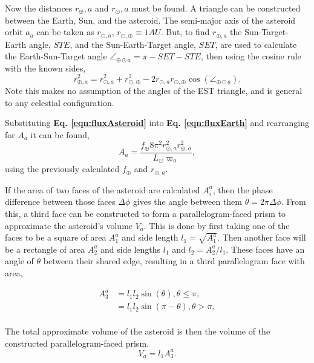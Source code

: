 \documentclass[10pt,twocolumn]{revtex4}    %
\newcommand*{\astrosun}{{\odot}}
\newcommand*{\earth}{{\oplus}}
\newcommand{\EST}{\angle_{\earth\astrosun a}}
\begin{document}
Now the distances $r_\earth,a$ and $r_\astrosun,a$ must be found. A triangle can be constructed between the Earth, Sun, and the asteroid. The semi-major axis of the asteroid orbit $a_a$ can be taken as $r_{\astrosun,a}$, $r_{\astrosun,\earth} \equiv 1AU$. But, to find $r_{\earth, a}$ the Sun-Target-Earth angle, $STE$, and the Sun-Earth-Target angle, $SET$, are used to calculate the Earth-Sun-Target angle $\EST = \pi - SET - STE$, then using the cosine rule with the known sides,
\begin{equation} \label{eqn:cosRule}
    r_{\earth,a}^2 = r_{\astrosun, a}^2 + r_{\astrosun, \earth}^2 - 2 r_{\astrosun,a} r_{\astrosun,\earth}\cos{(\angle_{\earth\astrosun a})}.
\end{equation}Note this makes no assumption of the angles of the EST triangle, and is general to any celestial configuration.  


Substituting \textbf{Eq. \ref{eqn:fluxAsteroid}} into \textbf{Eq. \ref{eqn:fluxEarth}} and rearranging for $A_{a}$ it can be found,
\begin{equation}\label{eqn:areaAsteroid}
    A_{a} = \frac{f_\earth 8 \pi^2 r^2_{\astrosun,a} r^2_{\earth, a}}{L_\astrosun \varpi_{a}},
\end{equation}
using the previously calculated  $f_\earth$ and $r_{\earth,a}$.

If the area of two faces of the asteroid are calculated $A^a_i$, then the phase difference between those faces $\Delta \phi$ gives the angle between them $\theta = 2\pi \Delta \phi$. From this, a third face can be constructed to form a parallelogram-faced prism to approximate the asteroid's volume $V_a$.
This is done by first taking one of the faces to be a square of area $A^a_1$ and side length $l_1 = \sqrt{A^a_1}$. Then another face will be a rectangle of area $A^a_2$ and side lengths $l_1$ and $l_2 = A^a_2/l_1$. These faces have an angle of $\theta$ between their shared edge, resulting in a third parallelogram face with area,

\begin{equation}\label{eqn:Aa3}
    \begin{split}
    A^a_3  &= l_1 l_2 \sin{(\theta)}, \theta \leq \pi, \\
            &= l_1 l_2 \sin{(\pi - \theta)}, \theta > \pi, \\
    \end{split}
\end{equation}

The total approximate volume of the asteroid is then the volume of the constructed parallelogram-faced prism. 
 \begin{equation}
     V_a = l_1 A^a_3.
 \end{equation}
\end{document}
